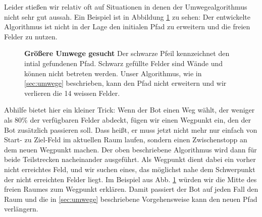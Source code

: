 Leider stießen wir relativ oft auf Situationen in denen der Umwegealgorithmus nicht sehr gut aussah.
Ein Beispiel ist in Abbildung \ref{fig:extending2} zu sehen: Der entwickelte Algorithmus ist nicht in der Lage den initialen Pfad zu erweitern und die freien Felder zu nutzen.


\begin{figure}[ht]
\centering
%
%
\caption{\textbf{Größere Umwege gesucht} Der schwarze Pfeil kennzeichnet den intial gefundenen Pfad. Schwarz gefüllte Felder sind Wände und können nicht betreten werden. Unser Algorithmus, wie in \ref{sec:umwege} beschrieben, kann den Pfad nicht erweitern und wir verlieren die 14 weissen Felder.}
\label{fig:extending2}
\end{figure}


Abhilfe bietet hier ein kleiner Trick:
Wenn der Bot einen Weg wählt, der weniger als 80\% der verfügbaren Felder abdeckt, fügen wir einen Wegpunkt ein, den der Bot zusätzlich passieren soll.
Dass heißt, er muss jetzt nicht mehr nur einfach von Start- zu Ziel-Feld im aktuellen Raum laufen, sondern einen Zwischenstopp an dem neuen Wegpunkt machen.
Der oben beschriebene Algorithmus wird dann für beide Teilstrecken nacheinander ausgeführt.
Als Wegpunkt dient dabei ein vorher nicht erreichtes Feld, und wir suchen eines, das möglichst nahe dem Schwerpunkt der nicht erreichten Felder liegt.
Im Beispiel aus Abb. \ref{fig:extending2} würden wir die Mitte des freien Raumes zum Wegpunkt erklären.
Damit passiert der Bot auf jeden Fall den Raum und die in \ref{sec:umwege} beschriebene Vorgehensweise kann den neuen Pfad verlängern.

